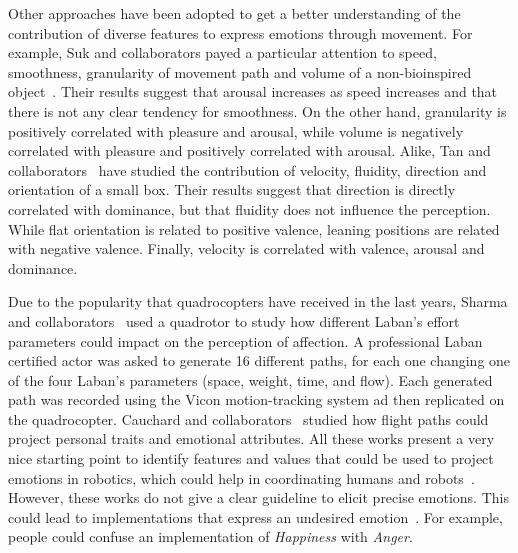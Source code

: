 Other approaches have been adopted to get a better understanding of the contribution of diverse features to express emotions through movement. For example, Suk and collaborators payed a particular attention to speed, smoothness, granularity of movement path and volume of a non-bioinspired object~\cite{NAM2014}. Their results suggest that arousal increases as speed increases and that there is not any clear tendency for smoothness. On the other hand, granularity is positively correlated with pleasure and arousal, while volume is negatively correlated with pleasure and positively correlated with arousal. Alike, Tan and collaborators~\cite{Tan2016} have studied the contribution of velocity, fluidity, direction and orientation of a small box. Their results suggest that direction is directly correlated with dominance, but that fluidity does not influence the perception. While flat orientation is related to positive valence, leaning positions are related with negative valence. Finally, velocity is correlated with valence, arousal and dominance.  

Due to the popularity that quadrocopters have received in the last years, Sharma and collaborators~\cite{Sharma2013} used a quadrotor to study how different Laban's effort~\cite{Laban1968} parameters could impact on the perception of affection. A professional Laban certified actor was asked to generate 16 different paths, for each one changing one of the four Laban's parameters (space, weight, time, and flow). Each generated path was recorded using the Vicon motion-tracking system ad then replicated on the quadrocopter. Cauchard and collaborators~\cite{Cauchard2016} studied how flight paths could project personal traits and emotional attributes. All these works present a very nice starting point to identify features and values that could be used to project emotions in robotics, which could help in coordinating humans and robots~\cite{Novika2015}. However, these works do not give a clear guideline to elicit precise emotions. This could lead to implementations that express an undesired emotion~\cite{Angel2016}. For example, people could confuse an implementation of \textit{Happiness} with \textit{Anger}.